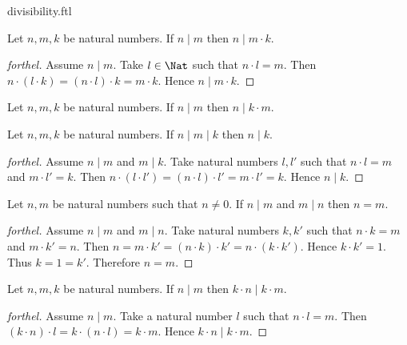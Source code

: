 \documentclass{naproche-library}
\begin{document}
\begin{smodule}{divisibility.ftl}
  \begin{proposition}[forthel,id=ARITHMETIC_07_7463519983239168,printid]
    Let $n, m, k$ be natural numbers.
    If $n \mid m$ then $n \mid m \cdot k$.
  \end{proposition}
  \begin{proof}[forthel]
    Assume $n \mid m$.
    Take $l \in \Nat$ such that $n \cdot l = m$.
    Then $n \cdot (l \cdot k)
      = (n \cdot l) \cdot k
      = m \cdot k$.
    Hence $n \mid m \cdot k$.
  \end{proof}

  \begin{corollary}[forthel,id=ARITHMETIC_07_1588185794609152,printid]
    Let $n, m, k$ be natural numbers.
    If $n \mid m$ then $n \mid k \cdot m$.
  \end{corollary}

  \begin{proposition}[forthel,id=ARITHMETIC_07_7863858316181504,printid]
    Let $n, m, k$ be natural numbers.
    If $n \mid m \mid k$ then $n \mid k$.
  \end{proposition}
  \begin{proof}[forthel]
    Assume $n \mid m$ and $m \mid k$.
    Take natural numbers $l,l'$ such that $n \cdot l = m$ and $m \cdot l' = k$.
    Then $n \cdot (l \cdot l')
      = (n \cdot l) \cdot l'
      = m \cdot l'
      = k$.
    Hence $n \mid k$.
  \end{proof}

  \begin{proposition}[forthel,id=ARITHMETIC_07_4933275640397824,printid]
    Let $n, m$ be natural numbers such that $n \neq 0$.
    If $n \mid m$ and $m \mid n$ then $n = m$.
  \end{proposition}
  \begin{proof}[forthel]
    Assume $n \mid m$ and $m \mid n$.
    Take natural numbers $k,k'$ such that $n \cdot k = m$ and $m \cdot k' = n$.
    Then $n
      = m \cdot k'
      = (n \cdot k) \cdot k'
      = n \cdot (k \cdot k')$.
    Hence $k \cdot k' = 1$.
    Thus $k = 1 = k'$.
    Therefore $n = m$.
  \end{proof}

  \begin{proposition}[forthel,id=ARITHMETIC_07_1283495225720832,printid]
    Let $n, m, k$ be natural numbers.
    If $n \mid m$ then $k \cdot n \mid k \cdot m$.
  \end{proposition}
  \begin{proof}[forthel]
    Assume $n \mid m$.
    Take a natural number $l$ such that $n \cdot l = m$.
    Then $(k \cdot n) \cdot l
      = k \cdot (n \cdot l)
      = k \cdot m$.
    Hence $k \cdot n \mid k \cdot m$.
  \end{proof}


\end{smodule}
\end{document}
